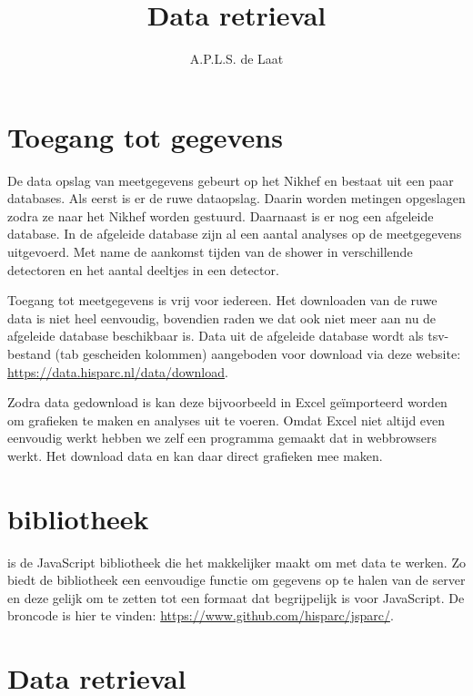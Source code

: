 

\title{Data retrieval}
\author{A.P.L.S. de Laat}



\maketitle

\section{Toegang tot \hisparc gegevens}

De data opslag van \hisparc meetgegevens gebeurt op het Nikhef en
bestaat uit een paar databases. Als eerst is er de ruwe dataopslag.
Daarin worden metingen opgeslagen zodra ze naar het Nikhef worden
gestuurd. Daarnaast is er nog een afgeleide database. In de afgeleide
database zijn al een aantal analyses op de meetgegevens uitgevoerd. Met
name de aankomst tijden van de shower in verschillende detectoren en het
aantal deeltjes in een detector.

Toegang tot \hisparc meetgegevens is vrij voor iedereen. Het downloaden
van de ruwe data is niet heel eenvoudig, bovendien raden we dat ook niet
meer aan nu de afgeleide database beschikbaar is. Data uit de afgeleide
database wordt als tsv-bestand (tab gescheiden kolommen) aangeboden voor
download via deze website: \url{https://data.hisparc.nl/data/download}.

Zodra data gedownload is kan deze bijvoorbeeld in Excel geïmporteerd
worden om grafieken te maken en analyses uit te voeren. Omdat Excel niet
altijd even eenvoudig werkt hebben we zelf een programma gemaakt dat in
webbrowsers werkt. Het download data en kan daar direct grafieken mee
maken.


\section{\jsparc bibliotheek}

\jsparc is de JavaScript bibliotheek die het makkelijker maakt om met
\hisparc data te werken. Zo biedt de bibliotheek een eenvoudige functie
om gegevens op te halen van de \hisparc server en deze gelijk om te
zetten tot een formaat dat begrijpelijk is voor JavaScript. De broncode
is hier te vinden: \url{https://www.github.com/hisparc/jsparc/}.


\section{Data retrieval}

